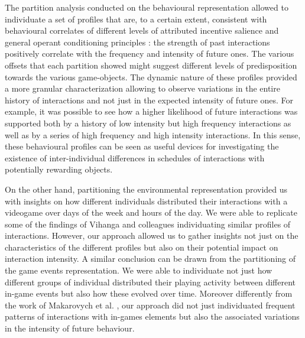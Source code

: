 The partition analysis conducted on the behavioural representation allowed to individuate a set of profiles that are, to a certain extent, consistent with behavioural correlates of different levels of attributed incentive salience \cite{berridge2004motivation} and general operant conditioning principles \cite{thorndike1927law, skinner1953science, nevin2000behavioral}: the strength of past interactions positively correlate with the frequency and intensity of future ones. The various offsets that each partition showed might suggest different levels of predisposition towards the various game-objects. The dynamic nature of these profiles provided a more granular characterization allowing to observe variations in the entire history of interactions and not just in the expected intensity of future ones. For example, it was possible to see how a higher likelihood of future interactions was supported both by a history of low intensity but high frequency interactions as well as by a series of high frequency and high intensity interactions. In this sense, these behavioural profiles can be seen as useful devices for investigating the existence of inter-individual differences in schedules of interactions with potentially rewarding objects. 

On the other hand, partitioning the environmental representation provided us with insights on how different individuals distributed their interactions with a videogame over days of the week and hours of the day. We were able to replicate some of the findings of Vihanga and colleagues \cite{vihanga2019weekly, wannigamage2021player} individuating similar profiles of interactions. However, our approach allowed us to gather insights not just on the characteristics of the different profiles but also on their potential impact on interaction intensity. A similar conclusion can be drawn from the partitioning of the game events representation. We were able to individuate not just  how different groups of individual distributed their playing activity between different in-game events but also how these evolved over time. Moreover differently from the work of Makarovych et al. \cite{makarovych2018like}, our approach did not just individuated frequent patterns of interactions with in-games elements but also the associated variations in the intensity of future behaviour.
